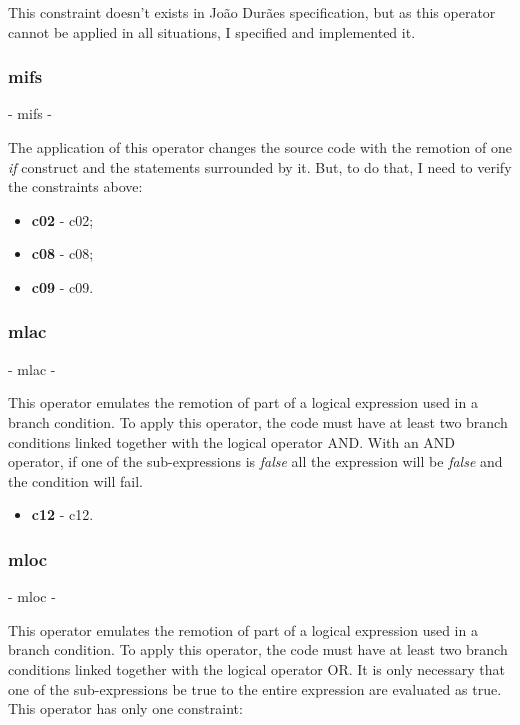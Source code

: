 	This constraint doesn't exists in João Durães specification, but as this operator cannot be applied in all situations, I specified and implemented it.

	\subsubsection{\textbf{\acs{mifs}}} - \Acl{mifs} - 

	The application of this operator changes the source code with the remotion of one \textit{if} construct and the statements surrounded by it.
	But, to do that, I need to verify the constraints above:
	\begin{itemize}
		\item \textbf{\acs{c02}} - \Acl{c02};
		\item \textbf{\acs{c08}} - \Acl{c08};
		\item \textbf{\acs{c09}} - \Acl{c09}.
	\end{itemize}

	\subsubsection{\textbf{\acs{mlac}}} - \Acl{mlac} - 

	This operator emulates the remotion of part of a logical expression used in a branch condition. To apply this operator, the code must have at least two branch conditions linked together with the logical operator AND. With an AND operator, if one of the sub-expressions is \textit{false} all the expression will be \textit{false} and the condition will fail.
	\begin{itemize}
		\item \textbf{\acs{c12}} - \Acl{c12}.
	\end{itemize}

	\subsubsection{\textbf{\acs{mloc}}} - \Acl{mloc} - 

	This operator emulates the remotion of part of a logical expression used in a branch condition. To apply this operator, the code must have at least two branch conditions linked together with the logical operator OR. It is only necessary that one of the sub-expressions be true to the entire expression are evaluated as true. This operator has only one constraint:

